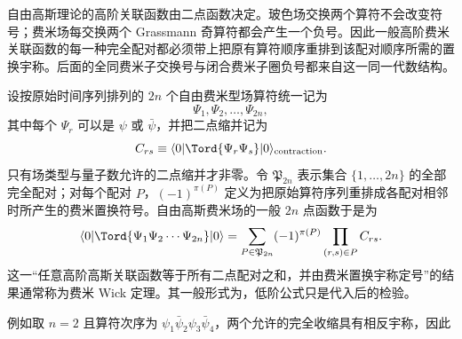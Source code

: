 自由高斯理论的高阶关联函数由二点函数决定。玻色场交换两个算符不会改变符号；费米场每交换两个 Grassmann 奇算符都会产生一个负号。因此一般高阶费米关联函数的每一种完全配对都必须带上把原有算符顺序重排到该配对顺序所需的置换宇称。后面的全同费米子交换号与闭合费米子圈负号都来自这一同一代数结构。


设按原始时间序列排列的 $2n$ 个自由费米型场算符统一记为
\[
\Psi_1,\Psi_2,\ldots,\Psi_{2n},
\]
其中每个 $\Psi_r$ 可以是 $\psi$ 或 $\bar\psi$，并把二点缩并记为
\begin{equation}
 C_{rs}\equiv
 \langle0|\Tord\{\Psi_r\Psi_s\}|0\rangle_{\rm contraction}.
 \label{eq:generic-fermion-contraction-dp8}
\end{equation}
只有场类型与量子数允许的二点缩并才非零。令 $\mathfrak P_{2n}$ 表示集合 $\{1,\ldots,2n\}$ 的全部完全配对；对每个配对 $P$，$(-1)^{\pi(P)}$ 定义为把原始算符序列重排成各配对相邻时所产生的费米置换符号。自由高斯费米场的一般 $2n$ 点函数于是为
\begin{equation}
 {
 \langle0|\Tord\{\Psi_1\Psi_2\cdots\Psi_{2n}\}|0\rangle
 =\sum_{P\in\mathfrak P_{2n}}
 (-1)^{\pi(P)}
 \prod_{(r,s)\in P} C_{rs}.}
 \label{eq:fermion-wick-general-dp73}
\end{equation}
这一“任意高阶高斯关联函数等于所有二点配对之和，并由费米置换宇称定号”的结果通常称为费米 Wick 定理。其一般形式为，低阶公式只是代入后的检验。

例如取 $n=2$ 且算符次序为 $\psi_1\bar\psi_2\psi_3\bar\psi_4$，两个允许的完全收缩具有相反宇称，因此



